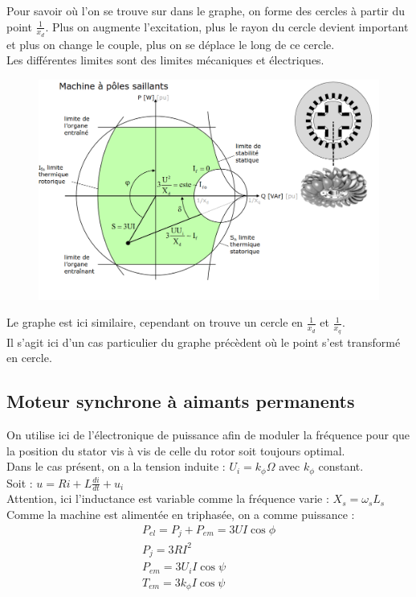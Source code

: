 \documentclass[../main.tex]{subfiles}
\begin{document}
Pour savoir où l'on se trouve sur dans le graphe, on forme des cercles à partir du point $\frac{1}{x_d}$. Plus on augmente l'excitation, plus le rayon du cercle devient important et plus on change le couple, plus on se déplace le long de ce cercle.\\

Les différentes limites sont des limites mécaniques et électriques.\\


\begin{figure}[hbt!]
    \centering
    \includegraphics[width=.7\textwidth]{IMAGES/machineelec/Screenshot from 2023-11-16 23-35-24.png}
\end{figure}

Le graphe est ici similaire, cependant on trouve un cercle en $\frac{1}{x_d}$ et $\frac{1}{x_q}$.\\
Il s'agit ici d'un cas particulier du graphe précèdent où le point s'est transformé en cercle.\\

\subsection{Moteur synchrone à aimants permanents}

On utilise ici de l'électronique de puissance afin de moduler la fréquence pour que la position du stator vis à vis de celle du rotor soit toujours optimal.\\

Dans le cas présent, on a la tension induite : $U_i = k_\phi \Omega$ avec $k_\phi$ constant.\\

Soit : $u = Ri + L \frac{di}{dt} + u_i$\\
\warning Attention, ici l'inductance est variable comme la fréquence varie : $X_s = \omega_s L_s$\\

Comme la machine est alimentée en triphasée, on a comme puissance : \\
\begin{equation}
    \begin{gathered}
        P_{el} = P_j + P_{em} = 3UI\cos\phi\\
        P_j = 3RI^2\\
        P_{em} = 3U_iI\cos\psi\\
        T_{em} = 3k_\phi I \cos\psi\\
    \end{gathered}
\end{equation}
\end{document}
